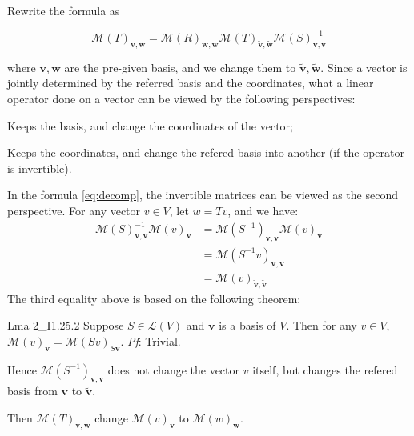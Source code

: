 \documentclass{article}
\newcommand{\basisTilde}[1]{\tilde{\pmb{#1}}}
\begin{document}
Rewrite the formula as

\begin{equation}
    \mathcal{M}(T)_{\pmb{v}, \pmb{w}} = \mathcal{M}(R)_{\pmb{w}, \pmb{w}}\mathcal{M}(T)_{\basisTilde{v}, \basisTilde{w}}\mathcal{M}(S)_{\pmb{v}, \pmb{v}}^{-1} \label{eq:decomp}
\end{equation}

where $\pmb{v}, \pmb{w}$ are the pre-given basis, and we change them to $\basisTilde{v}, \basisTilde{w}$. Since a vector is jointly determined by the referred basis and the coordinates, what a linear operator done on a vector can be viewed by the following perspectives:
\begin{compactenum}
    \item Keeps the basis, and change the coordinates of the vector;
    \item Keeps the coordinates, and change the refered basis into another (if the operator is invertible).
\end{compactenum}
In the formula \eqref{eq:decomp}, the invertible matrices can be viewed as the second perspective. For any vector $v\in V$, let $w = Tv$, and we have:
$$
\begin{aligned}
    \mathcal{M}(S)^{-1}_{\pmb{v}, \pmb{v}}\mathcal{M}(v)_{\pmb{v}} &= \mathcal{M}(S^{-1})_{\pmb{v}, \pmb{v}}\mathcal{M}(v)_{\pmb{v}} \\
    &= \mathcal{M}(S^{-1}v)_{\pmb{v}, \pmb{v}} \\
    &= \mathcal{M}(v)_{\basisTilde{v}, \basisTilde{v}}
\end{aligned}
$$
The third equality above is based on the following theorem:
\begin{Th}{Lma 2\_I1.25.2}
    Suppose $S\in\mathcal{L}(V)$ and $\pmb{v}$ is a basis of $V$. Then for any $v\in V$, $\mathcal{M}(v)_{\pmb{v}} = \mathcal{M}(Sv)_{S\pmb{v}}$.
    \tcblower
    \textit{Pf}: Trivial.
\end{Th}

Hence $\mathcal{M}(S^{-1})_{\pmb{v}, \pmb{v}}$ does not change the vector $v$ itself, but changes the refered basis from $\pmb{v}$ to $\basisTilde{v}$. 

Then $\mathcal{M}(T)_{\basisTilde{v}, \basisTilde{w}}$ change $\mathcal{M}(v)_{\basisTilde{v}}$ to $\mathcal{M}(w)_{\basisTilde{w}}$. 
\end{document}
